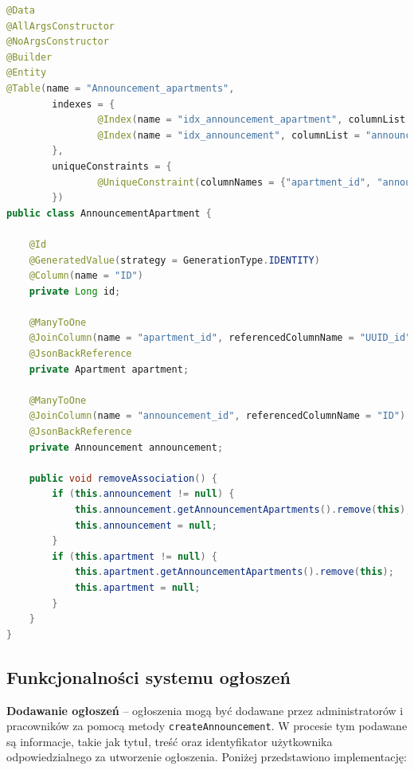 \begin{lstlisting}[language=Java, caption=Encja \texttt{AnnouncementApartment}]
@Data
@AllArgsConstructor
@NoArgsConstructor
@Builder
@Entity
@Table(name = "Announcement_apartments",
        indexes = {
                @Index(name = "idx_announcement_apartment", columnList = "apartment_id"),
                @Index(name = "idx_announcement", columnList = "announcement_id")
        },
        uniqueConstraints = {
                @UniqueConstraint(columnNames = {"apartment_id", "announcement_id"})
        })
public class AnnouncementApartment {

    @Id
    @GeneratedValue(strategy = GenerationType.IDENTITY)
    @Column(name = "ID")
    private Long id;

    @ManyToOne
    @JoinColumn(name = "apartment_id", referencedColumnName = "UUID_id")
    @JsonBackReference
    private Apartment apartment;

    @ManyToOne
    @JoinColumn(name = "announcement_id", referencedColumnName = "ID")
    @JsonBackReference
    private Announcement announcement;

    public void removeAssociation() {
        if (this.announcement != null) {
            this.announcement.getAnnouncementApartments().remove(this);
            this.announcement = null;
        }
        if (this.apartment != null) {
            this.apartment.getAnnouncementApartments().remove(this);
            this.apartment = null;
        }
    }
}
\end{lstlisting}

\subsection{Funkcjonalności systemu ogłoszeń}

\textbf{Dodawanie ogłoszeń} -- ogłoszenia mogą być dodawane przez administratorów i pracowników za pomocą metody \texttt{createAnnouncement}. W procesie tym podawane są informacje, takie jak tytuł, treść oraz identyfikator użytkownika odpowiedzialnego za utworzenie ogłoszenia. Poniżej przedstawiono implementację:

